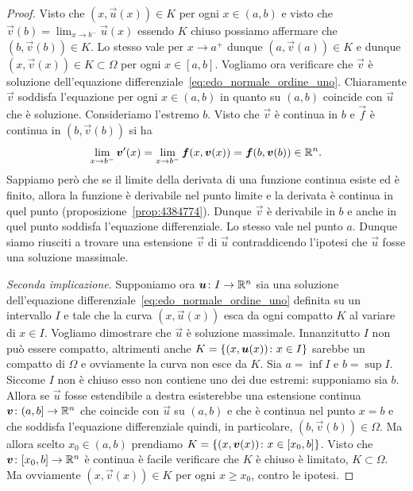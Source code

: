 \begin{proof}
Visto che $(x,\vec u(x)) \in K$ per ogni $x\in(a,b)$ e visto che
$\vec v(b) = \lim_{x\to b^-}\vec u(x)$ essendo $K$ chiuso possiamo affermare che
$(b,\vec v(b)) \in K$.
Lo stesso vale per $x\to a^+$ dunque $(a,\vec v(a))\in K$
e dunque $(x,\vec v(x))\in K \subset \Omega$ per ogni $x\in [a,b]$.
Vogliamo ora verificare che $\vec v$ è soluzione dell'equazione differenziale~\eqref{eq:edo_normale_ordine_uno}.
Chiaramente $\vec v$ soddisfa l'equazione per ogni $x\in (a,b)$
in quanto su $(a,b)$ coincide con $\vec u$ che è soluzione.
Consideriamo l'estremo $b$.
Visto che $\vec v$ è continua in $b$ e $\vec f$ è continua in $(b,\vec v(b))$ si ha
\[
  \lim_{x\to b^-} \boldsymbol v'(x)
  = \lim_{x\to b^-} \boldsymbol f(x,\boldsymbol v(x))
  = \boldsymbol f(b,\boldsymbol v(b)) \in {\mathbb R}^n.
\]
Sappiamo però che se il limite della derivata di una funzione continua esiste ed è finito, allora la funzione è derivabile nel punto limite e la derivata è continua in quel punto
(proposizione~\ref{prop:4384774}).
Dunque $\vec v$ è derivabile in $b$ e anche in quel punto soddisfa l'equazione differenziale. Lo stesso vale nel punto $a$. Dunque siamo riusciti a trovare una estensione $\vec v$ di $\vec u$ contraddicendo l'ipotesi che $\vec u$ fosse una soluzione massimale.

\emph{Seconda implicazione}. Supponiamo ora $\boldsymbol u\colon I\to {\mathbb R}^n$ sia una soluzione dell'equazione 
differenziale~\eqref{eq:edo_normale_ordine_uno} definita su un intervallo $I$ e tale che la curva 
$(x,\vec u(x))$ esca da ogni compatto $K$ al variare di $x\in I$. 
Vogliamo dimostrare che $\vec u$ è soluzione massimale. 
Innanzitutto $I$ non può essere compatto, altrimenti anche $K={\left\{ (x,\boldsymbol u(x))\colon x \in I \right\}}$ 
sarebbe un compatto di $\Omega$ e ovviamente la curva non esce da $K$.
Sia $a=\inf I$ e $b=\sup I$. 
Siccome $I$ non è chiuso esso non contiene uno dei due estremi: supponiamo sia $b$. 
Allora se $\vec u$ fosse estendibile a destra esisterebbe una estensione continua 
$\boldsymbol v\colon (a,b]\to {\mathbb R}^n$ che coincide con $\vec u$ su $(a,b)$ e che è continua 
nel punto $x=b$ e che soddisfa l'equazione differenziale quindi, in particolare, $(b,\vec v(b))\in \Omega$.
Ma allora scelto $x_0 \in (a,b)$
prendiamo $K={\left\{ (x,\boldsymbol v(x))\colon x\in [x_0,b] \right\}}$. 
Visto che $\boldsymbol v\colon[x_0,b]\to {\mathbb R}^n$ è continua è facile verificare che $K$ è chiuso è limitato, 
$K\subset \Omega$. Ma ovviamente $(x,\vec v(x))\in K$ per ogni $x\ge x_0$, contro le ipotesi.
\end{proof}

